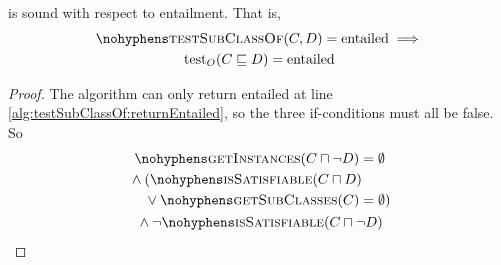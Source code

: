 \documentclass[paper.tex]{subfiles}
\begin{document}
\begin{lemma}
  \label{lem:testSubClassOfEntailedSound}
   is sound with respect to entailment.  That is,
  \begin{multline*}
    \textproc{testSubClassOf}(C, D) = \mathrm{entailed} \implies \\
    \test_O(C \sqsubseteq D) = \mathrm{entailed}
  \end{multline*}
\end{lemma}
\begin{proof}
  The algorithm can only return entailed at line \ref{alg:testSubClassOf:returnEntailed}, so the three if-conditions must all be false.  So
  \begin{multline}
    \label{eqn:testSubClassOfEntailed}
    \textproc{getInstances}(C \sqcap \neg D) = \emptyset \\
    {} \land \begin{aligned}[t]
      & (\textproc{isSatisfiable}(C \sqcap D) \\
      & \lor \textproc{getSubClasses}(C) = \emptyset)
    \end{aligned} \\
    {} \land \lnot \textproc{isSatisfiable}(C \sqcap \neg D)
  \end{multline}



\end{proof}
\end{document}
